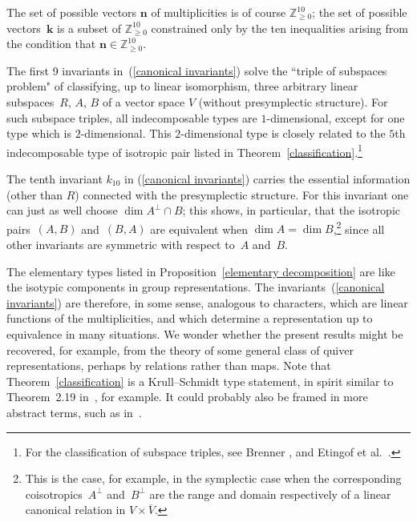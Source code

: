 \documentclass[10pt,a4paper]{amsart}
\numberwithin{equation}{section}
\begin{document}
\begin{Remark}
The set of possible vectors $\textbf{n}$ of multiplicities is  of course $\mathbb{Z}_{\geq 0}^{10}$; the set of possible vectors~$\textbf{k}$ is a subset of $\mathbb{Z}_{\geq 0}^{10}$ constrained only by the ten inequalities arising from the condition that $\textbf{n} \in \mathbb{Z}_{\geq 0}^{10}$.
\end{Remark}

\begin{Remark}
The f\/irst 9 invariants in~(\ref{canonical invariants}) solve the ``triple of subspaces problem" of classifying, up to linear isomorphism, three arbitrary linear subspaces~$R$, $A$, $B$ of a vector space $V$ (without presymplectic structure). For such subspace triples, all indecomposable types are $1$-dimensional, except for one type which is $2$-dimensional. This $2$-dimensional type is closely related to the $5$th indecomposable type of isotropic pair listed in Theorem~\ref{classification}.\footnote{For the classif\/ication of subspace triples, see Brenner \cite[pp.~109--110]{Brenner_Three_Subspaces}, and Etingof et al.~\cite[pp.~84--86]{Etingof}.}

The tenth invariant $k_{10}$ in (\ref{canonical invariants}) carries the essential information  (other than $R$) connected with the presymplectic structure. For this invariant one can just as well choose $\dim A^{\perp} \cap B$; this shows, in particular, that the isotropic pairs~$(A,B)$ and~$(B,A)$ are equivalent when $\dim A = \dim B$,\footnote{This is the case, for example, in the symplectic case when the corresponding coisotropics~$A^\perp$ and~$B^\perp$ are the range and domain respectively of a linear canonical relation in $V \times \overline V.$} since all other invariants are symmetric with respect to~$A$ and~$B$.
\end{Remark}

\begin{Remark}\label{rep theory}
The elementary types listed in Proposition~\ref{elementary decomposition} are like the isotypic components in group representations.   The invariants~(\ref{canonical invariants}) are therefore, in some sense, analogous to characters, which are linear functions of the multiplicities, and which determine a representation up to equivalence in many situations. We wonder whether the present results might be recovered, for example, from the theory of some general class of quiver representations, perhaps by relations rather than maps. Note that Theorem~\ref{classification} is a Krull--Schmidt type statement, in spirit similar to Theorem~2.19 in~\cite{Etingof}, for example. It could probably also be framed in more abstract terms, such as in~\cite{Atiyah}.
\end{Remark}
\end{document}
